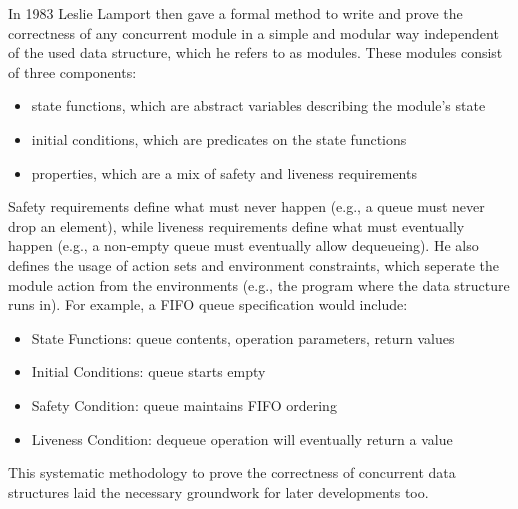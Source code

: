 In 1983 Leslie Lamport then gave a formal method to write and prove the correctness of any concurrent module in a simple and modular way independent of the used data structure, which he refers to as modules. These modules consist of three components: 
\begin{itemize}
   \item state functions, which are abstract variables describing the module's state
   \item initial conditions, which are predicates on the state functions
   \item properties, which are a mix of safety and liveness requirements
\end{itemize}
Safety requirements define what must never happen (e.g., a queue must never drop an element), while liveness requirements define what must eventually happen (e.g., a non-empty queue must eventually allow dequeueing). He also defines the usage of action sets and environment constraints, which seperate the module action from the environments (e.g., the program where the data structure runs in). For example, a \ac{FIFO} queue specification would include:
\begin{itemize}
   \item State Functions: queue contents, operation parameters, return values
   \item Initial Conditions: queue starts empty
   \item Safety Condition: queue maintains \ac{FIFO} ordering
   \item Liveness Condition: dequeue operation will eventually return a value
\end{itemize}
This systematic methodology to prove the correctness of concurrent data structures laid the necessary groundwork for later developments too. \cite{Lamport1983SPSCCircularBuffer}

